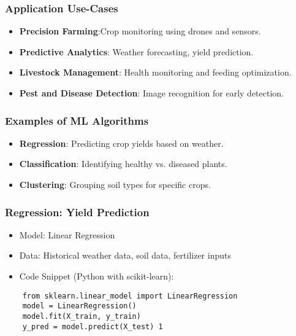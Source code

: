 \begin{frame}[fragile]\frametitle{Application Use-Cases}
  \begin{itemize}
    \item \textbf{Precision Farming}:Crop monitoring using drones and sensors.
    \item \textbf{Predictive Analytics}: Weather forecasting, yield prediction.
    \item \textbf{Livestock Management}: Health monitoring and feeding optimization.
    \item \textbf{Pest and Disease Detection}: Image recognition for early detection.
  \end{itemize}
\end{frame}


\begin{frame}[fragile]\frametitle{Examples of ML Algorithms}
  \begin{itemize}
    \item \textbf{Regression}: Predicting crop yields based on weather.
    \item \textbf{Classification}: Identifying healthy vs. diseased plants.
    \item \textbf{Clustering}: Grouping soil types for specific crops.
  \end{itemize}
\end{frame}

\begin{frame}[fragile]\frametitle{Regression: Yield Prediction}
	\begin{itemize}
	\item Model: Linear Regression
	\item Data: Historical weather data, soil data, fertilizer inputs
	\item Code Snippet (Python with scikit-learn):
	\end{itemize}
	
	\begin{lstlisting}
	from sklearn.linear_model import LinearRegression
	model = LinearRegression()
	model.fit(X_train, y_train)
	y_pred = model.predict(X_test) 1 
	\end{lstlisting}	
\end{frame}

